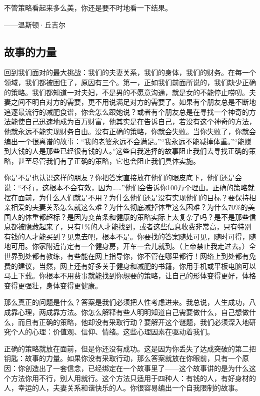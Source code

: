 \begin{BookQuote}
不管策略看起来多么美，你还是要不时地看一下结果。

\hfill ——温斯顿·丘吉尔
\end{BookQuote}

\subsection{故事的力量}

回到我们面对的最大挑战：我们的夫妻关系，我们的身体，我们的财务。在每一个领域，我们都被困住了，原因有三个。第一，正如我们前面所说的，我们缺少正确的策略。我们都知道一对夫妇，不是男的不愿意沟通，就是女的不能停止唠叨。夫妻之间不明白对方的需要，更不用说满足对方的需要了。如果有个朋友总是不断地追逐最流行的减肥食谱，你会怎么跟她说？或者有个朋友总是在寻找一个神奇的方法能使自己迅速地成为百万财富，他其实是在告诉自己，若没有这个神奇的方法，他就永远不能实现财务自由。没有正确的策略，你就会失败。当你失败了，你就会编出一个很离谱的故事：“我的老婆永远不会满足。”“我永远不能减掉体重。”“能赚到大钱的人是那些已经很有钱的人。”这些自我选择的故事阻止我们去寻找正确的策略，甚至尽管我们有了正确的策略，它也会阻止我们具体实施。

你是不是也认识这样的朋友？你把答案直接放在他们的眼皮底下，他们还是会说：“不行，这根本不会有效，因为……”他们会告诉你100万个理由。正确的策略就摆在面前，为什么人们就是不用？为什么他们还是没有实现他们的目标？要保持相亲相爱的夫妻关系怎么就这么难？为什么彻底减掉体重这么困难？为什么70\%的美国人的体重都超标？是因为变苗条和健康的策略实际上太复杂了吗？是不是那些信息都被隐藏起来了，只有1\%的人才能找到，或者这些信息收费非常高，只有特别有钱的人才能买到？见鬼去吧，根本不是。你要找的答案随处可见，随时可得，随地可用。你家附近肯定有一个健身房，开车一会儿就到。（上帝禁止我走过去。）全世界到处都有教练，有些能在网上指导你，你不管在哪里都行！网络上到处都有免费的建议，当然，网上还有好多关于健身和减肥的书籍，你用手机或平板电脑可以马上下载。你根本不用费事就能找到你想要的策略，让自己的形体变得更好，体格变得更强壮，身体变得更健康。

那么真正的问题是什么？答案是我们必须把人性考虑进来。我总说，人生成功，八成靠心理，两成靠方法。你怎么解释有些人明明知道自己需要做什么，自己想做什么，而且有正确的策略，他却没有采取行动？要解开这个谜题，我们必须深入地研究个人的心理：价值观、信仰、情绪。这些心理因素在驱动着我们。

正确的策略就放在面前，但是你还没有成功。这是因为你丢失了达成突破的第二把钥匙：故事的力量。如果你没有采取行动，那么答案就放在你眼前，只有一个原因：你创造出了一套信念，已经绑定在一个故事里了——这个故事讲的是为什么这个方法你用不行，别人用就行。这个方法只适用于四种人：有钱的人，有好身材的人，幸运的人，夫妻关系和谐快乐的人。你很容易编出一个自我限制的故事。

